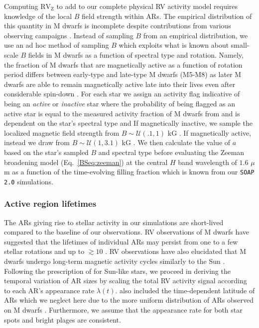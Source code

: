 Computing $\text{RV}_{\text{Z}}$ to add to our complete physical RV activity model requires knowledge of the
local $B$ field strength within
ARs. The empirical distribution of this quantity in M dwarfs is incomplete despite contributions from
various observing campaigns \citep[e.g.][]{reiners07, shulyak14, hebrard16, moutou17, shulyak17}. 
Instead of sampling $B$ from an empirical distribution, we use an ad hoc method of sampling $B$ which
exploits what is known about small-scale $B$
fields in M dwarfs as a function of spectral type and rotation. Namely, the fraction of M dwarfs
that are magnetically active as a function of rotation period differs between early-type
and late-type M dwarfs (M5-M8) as later M dwarfs are able to remain magnetically
active late into their lives even after considerable spin-down \citep{west15}. For each star we assign an
activity flag indicative of being an \emph{active} or \emph{inactive} star where the probability of being
flagged as an active star is equal to the measured activity fraction of M dwarfs from \cite{west15} and 
is dependent on the star's spectral type and  If magnetically inactive, we sample the localized
magnetic field strength from $B \sim \mathcal{U}(.1,1)$ kG \citep{moutou17}. If magnetically active, instead
we draw from $B \sim \mathcal{U}(1,3.1)$ kG \citep{moutou17}. We then calculate the value of $a$ based on the
star's sampled $B$ and spectral type before evaluating the Zeeman broadening model (Eq.~\ref{BSeq:zeeman}) at the
central $H$ band wavelength of $1.6$ $\mu$m as a function of the time-evolving filling fraction which is known
from our \texttt{SOAP 2.0} simulations.


\subsubsection{Active region lifetimes} \label{BSsect:lifetimes}
The ARs giving rise to stellar activity in our simulations are short-lived compared to the baseline
of our observations. RV observations of M dwarfs have suggested that the lifetimes of individual ARs
may persist from one to a few stellar rotations and up to $\gtrsim 10$
\citep[e.g.][]{bonfils07,forveille09,hebrard16}. RV observations have also elucidated that M dwarfs undergo
long-term magnetic
activity cycles similarly to the Sun \citep[e.g.][]{gomesdasilva12, route16}. Following the prescription
of \cite{dumusque16a} for Sun-like stars, we proceed in deriving the temporal variation of AR sizes by scaling the
total RV activity signal according to each AR's appearance rate $\lambda(t)$. \cite{dumusque16a} also included
the time-dependent latitude of ARs which we neglect here due to the more uniform distribution of ARs observed
on M dwarfs \citep{barnes01, barnes04}. Furthermore, we assume that the appearance rate for both star spots and
bright plages are consistent. \\

